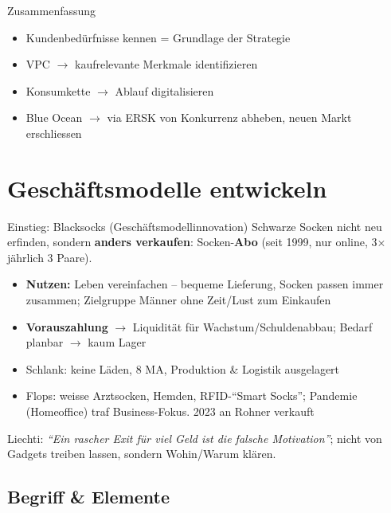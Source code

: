\documentclass[a4paper, fontsize=7pt]{scrartcl}
\begin{document}
\begin{subbox}{Zusammenfassung}
\begin{itemize}
    \item Kundenbedürfnisse kennen = Grundlage der Strategie
    \item VPC $\to$ kaufrelevante Merkmale identifizieren
    \item Konsumkette $\to$ Ablauf digitalisieren
    \item Blue Ocean $\to$ via ERSK von Konkurrenz abheben, neuen Markt
    erschliessen
\end{itemize}
\end{subbox}

\section{Geschäftsmodelle entwickeln}

\begin{subbox}{Einstieg: Blacksocks (Geschäftsmodellinnovation)}
Schwarze Socken nicht neu erfinden, sondern \textbf{anders verkaufen}:
Socken-\textbf{Abo} (seit 1999, nur online, 3$\times$ jährlich 3 Paare).
\begin{itemize}
    \item \textbf{Nutzen:} Leben vereinfachen -- bequeme Lieferung, Socken
    passen immer zusammen; Zielgruppe Männer ohne Zeit/Lust zum Einkaufen
    \item \textbf{Vorauszahlung} $\to$ Liquidität für Wachstum/Schuldenabbau;
    Bedarf planbar $\to$ kaum Lager
    \item Schlank: keine Läden, 8 MA, Produktion \& Logistik ausgelagert
    \item Flops: weisse Arztsocken, Hemden, RFID-``Smart Socks'';
    Pandemie (Homeoffice) traf Business-Fokus. 2023 an Rohner verkauft
\end{itemize}
Liechti: \emph{``Ein rascher Exit für viel Geld ist die falsche
Motivation''}; nicht von Gadgets treiben lassen, sondern Wohin/Warum klären.
\end{subbox}

\subsection{Begriff \& Elemente}
\end{document}
